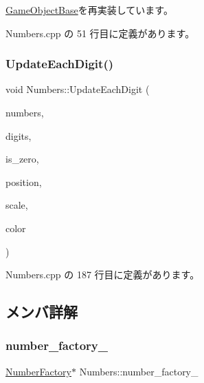 \mbox{\hyperlink{class_game_object_base_a97e1bc277d7b1c0156d4735de29a022c}{Game\+Object\+Base}}を再実装しています。



 Numbers.\+cpp の 51 行目に定義があります。

\mbox{\label{class_numbers_a629383f243c0aeb25bf9e8d067e965a2}} 
\subsubsection{\texorpdfstring{Update\+Each\+Digit()}{UpdateEachDigit()}}
{\footnotesize\ttfamily void Numbers\+::\+Update\+Each\+Digit (\begin{DoxyParamCaption}\item[{int}]{numbers,  }\item[{int}]{digits,  }\item[{bool}]{is\+\_\+zero,  }\item[{\mbox{\hyperlink{_vector3_d_8h_a5ef6e95dfc5f9d3820b71772d99bbc25}{Vec2}}}]{position,  }\item[{\mbox{\hyperlink{_vector3_d_8h_a5ef6e95dfc5f9d3820b71772d99bbc25}{Vec2}}}]{scale,  }\item[{\mbox{\hyperlink{_vector3_d_8h_a680c30c4a07d86fe763c7e01169cd6cc}{X\+Color4}}}]{color }\end{DoxyParamCaption})\hspace{0.3cm}{\ttfamily [private]}}



 Numbers.\+cpp の 187 行目に定義があります。



\subsection{メンバ詳解}
\mbox{\label{class_numbers_af9e8fa1658caf4beddfb6f450d8dc053}} 
\subsubsection{\texorpdfstring{number\+\_\+factory\+\_\+}{number\_factory\_}}
{\footnotesize\ttfamily \mbox{\hyperlink{class_number_factory}{Number\+Factory}}$\ast$ Numbers\+::number\+\_\+factory\+\_\+\hspace{0.3cm}{\ttfamily [private]}}




